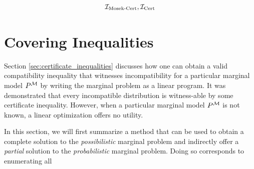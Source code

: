 \documentclass[aps, 10pt, english, twoside, pra, nofootinbib, longbibliography]{revtex4-1}
\theoremstyle{plain}
\theoremstyle{definition}
\theoremstyle{remark}
\newcommand{\mscenario}{\mathcal{M}}
\begin{document}
    \[ \mathcal{I}_\text{Mosek-Cert}, \mathcal{I}_\text{Cert} \]

    \section{Covering Inequalities}

    Section \ref{sec:certificate_inequalities} discusses how one can obtain a valid compatibility inequality that witnesses incompatibility for a particular marginal model $\prob^{\mscenario}$ by writing the marginal problem as a linear program. It was demonstrated that every incompatible distribution is witness-able by some certificate inequality. However, when a particular marginal model $\prob^{\mscenario}$ is not known, a linear optimization offers no utility.

    In this section, we will first summarize a method that can be used to obtain a complete solution to the \textit{possibilistic} marginal problem and indirectly offer a \textit{partial} solution to the \textit{probabilistic} marginal problem. Doing so corresponds to enumerating all
\end{document}
